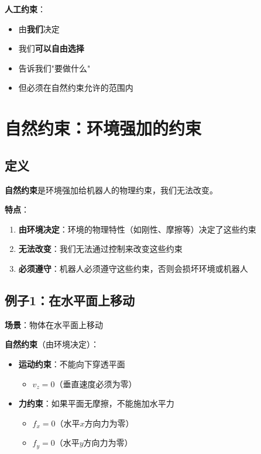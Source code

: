 \documentclass[12pt,a4paper]{article}
\begin{document}
\textbf{人工约束}：
\begin{itemize}
\item 由\textbf{我们}决定
\item 我们\textbf{可以自由选择}
\item 告诉我们"要做什么"
\item 但必须在自然约束允许的范围内
\end{itemize}

\section{自然约束：环境强加的约束}

\subsection{定义}

\textbf{自然约束}是环境强加给机器人的物理约束，我们无法改变。

\textbf{特点}：
\begin{enumerate}
\item \textbf{由环境决定}：环境的物理特性（如刚性、摩擦等）决定了这些约束
\item \textbf{无法改变}：我们无法通过控制来改变这些约束
\item \textbf{必须遵守}：机器人必须遵守这些约束，否则会损坏环境或机器人
\end{enumerate}

\subsection{例子1：在水平面上移动}

\textbf{场景}：物体在水平面上移动

\textbf{自然约束}（由环境决定）：
\begin{itemize}
\item \textbf{运动约束}：不能向下穿透平面
\begin{itemize}
\item $v_z = 0$（垂直速度必须为零）
\end{itemize}
\item \textbf{力约束}：如果平面无摩擦，不能施加水平力
\begin{itemize}
\item $f_x = 0$（水平$x$方向力为零）
\item $f_y = 0$（水平$y$方向力为零）
\end{itemize}
\end{itemize}
\end{document}
